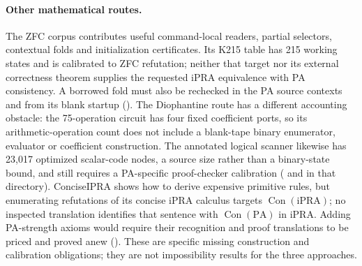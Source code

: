 \paragraph{Other mathematical routes.}
The ZFC corpus contributes useful command-local readers, partial
selectors, contextual folds and initialization certificates.  Its K215
table has 215 working states and is calibrated to ZFC refutation;
neither that target nor its external correctness theorem supplies the
requested iPRA equivalence with PA consistency.  A borrowed fold must
also be rechecked in the PA source contexts and from its blank startup
().  The
Diophantine route has a different accounting obstacle: the 75-operation
circuit has four fixed coefficient ports, so its arithmetic-operation
count does not include a blank-tape binary enumerator, evaluator or
coefficient construction.  The annotated logical scanner likewise
has 23,017 optimized scalar-code nodes, a source size rather than a
binary-state bound, and still requires a PA-specific proof-checker
calibration (
and  in that directory).
ConciseIPRA shows how to derive expensive primitive rules, but enumerating
refutations of its concise iPRA calculus targets $\operatorname{Con}(\mathrm{iPRA})$;
no inspected translation identifies that sentence with
$\operatorname{Con}(\mathrm{PA})$ in iPRA.  Adding PA-strength
axioms would require their recognition and proof translations to be
priced and proved anew
().
These are specific missing construction and calibration obligations;
they are not impossibility results for the three approaches.
